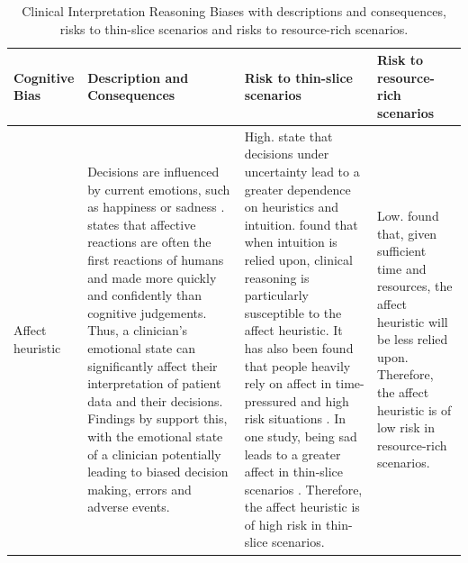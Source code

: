\documentclass[a4paper]{scrartcl}     %
\begin{document}
  \begin{landscape}
    \pagestyle{plain}
    \small
    \renewcommand{\arraystretch}{1.5}
    \begin{longtabu} to \linewidth {X[1.2,l] X[3,p] X[3,p] X[3,p]}
    \caption{Clinical Interpretation Reasoning Biases with descriptions and consequences, risks to thin-slice scenarios and risks to resource-rich scenarios.\label{table:cirbs-expanded}} \\
    \toprule
    Cognitive Bias & Description and Consequences & Risk to thin-slice scenarios & Risk to resource-rich scenarios \\
    \midrule
    \endhead

    Affect heuristic %
      & Decisions are influenced by current emotions, such as happiness or sadness \citep{Zajonc1980}.
        \citet{Zajonc1980} states that affective reactions are often the first reactions of humans and made more quickly and confidently than cognitive judgements. Thus, a clinician's emotional state can significantly affect their interpretation of patient data and their decisions.
        Findings by \citet{Croskerry2010} support this, with the emotional state of a clinician potentially leading to biased decision making, errors and adverse events.

      & High.
        \citet{Tversky1974} state that decisions under uncertainty lead to a greater dependence on heuristics and intuition. \citet{Croskerry2010} found that when intuition is relied upon, clinical reasoning is particularly susceptible to the affect heuristic. It has also been found that people heavily rely on affect in time-pressured and high risk situations \citep{Finucane1998}. In one study, being sad leads to a greater affect in thin-slice scenarios \citep{Ambady2002}.
        Therefore, the affect heuristic is of high risk in thin-slice scenarios.

      & Low.
        \citet{Finucane1998} found that, given sufficient time and resources, the affect heuristic will be less relied upon.
        Therefore, the affect heuristic is of low risk in resource-rich scenarios. \\


\end{longtabu}
\end{landscape}
\end{document}
